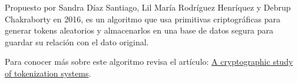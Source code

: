 %
%

Propuesto por Sandra Díaz Santiago, Lil María Rodríguez
Henríquez y Debrup Chakraborty en 2016, es un algoritmo que usa
primitivas criptográficas para generar tokens aleatorios y
almacenarlos en una base de datos segura para guardar su
relación con el dato original.

Para conocer más sobre este algoritmo revisa el artículo:
\href{https://link.springer.com/article/10.1007%2Fs10207-015-0313-x}
{A cryptographic study of tokenization systems}.
